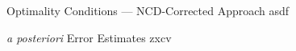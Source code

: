 \begin{frame}{Optimality Conditions --- NCD-Corrected Approach}
    asdf
\end{frame}

\begin{frame}{\textit{a posteriori} Error Estimates}
    zxcv
\end{frame}